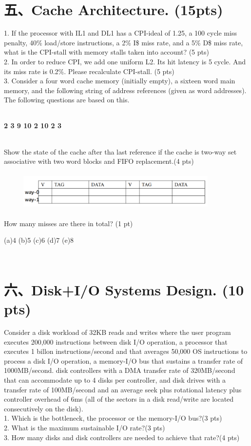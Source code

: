 \documentclass[UTF8]{ctexart}
\begin{document}
\section*{五、Cache Architecture. (15pts)}
1. If the processor with IL1 and DL1 has a CPI-ideal of 1.25, a 100 cycle miss penalty, 40\% load/store instructions, a 2\% I\$ miss rate, and a 5\% D\$ miss rate,
what is the CPI-stall with memory stalls taken into account? (5 pts)\\
2. In order to reduce CPI, we add one uniform L2. Its hit latency is 5 cycle. And its miss rate is 0.2\%. Please recalculate CPI-stall. (5 pts)\\
3. Consider a four word cache memory (initially empty), a sixteen word main memory, and the following string of address references (given as word addresses). The 
following questions are based on this.\\\
\centerline{\bfseries 2 3 9 10 2 10 2 3}\\
Show the state of the cache after tha last reference if the cache is two-way set associative with two word blocks and FIFO replacement.(4 pts)
\begin{figure}[H]                                            
    \centering                                                
    \includegraphics[width=10cm,height=2cm]{5.png}        
    \caption*{}                                                                                 
\end{figure}  
How many misses are there in total? (1 pt)\\
\centerline{(a)4 (b)5 (c)6 (d)7 (e)8}\\

\section*{六、Disk+I/O Systems Design. (10 pts)}
Consider a disk workload of 32KB reads and writes where the user program executes 200,000 instructions between disk I/O operation, a processor
that executes 1 billon instructions/second and that averages 50,000 OS instructions to process a disk I/O operation, a memory-I/O bus that sustains
a transfer rate of 1000MB/second. disk controllers with a DMA transfer rate of 320MB/second that can accommodate up to 4 disks per controller, and 
disk drives with a transfer rate of 100MB/second and an average seek plus rotational latency plus controller overhead of 6ms (all of the sectors in 
a disk read/write are located consecutively on the disk).\\
1. Which is the bottleneck, the processor or the memory-I/O bus?(3 pts)\\
2. What is the maximum sustainable I/O rate?(3 pts)\\
3. How many disks and disk controllers are needed to achieve that rate?(4 pts)\\
\end{document}
